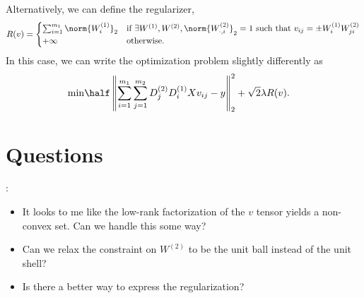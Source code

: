 \documentclass{article}
\newcommand{\wone}{W^{(1)}}
\newcommand{\wtwo}{W^{(2)}}
\newcommand{\Done}{D^{(1)}}
\newcommand{\Dtwo}{D^{(2)}}
\begin{document}
Alternatively, we can define the regularizer,
\[
    R(v) =
    \begin{cases}
        \sum_{i=1}^{m_1}
        \norm{\wone_{i}}_2
         & \mbox{if \( \exists \wone, \wtwo,
        \norm{\wtwo_{\cdot, i}}_2 = 1 \) such that \( v_{ij} = \pm \wone_{i} \wtwo_{ji} \)} \\
        +\infty
         & \mbox{otherwise.}
    \end{cases}
\]
In this case, we can write the optimization problem slightly differently as
\begin{equation}
    \begin{aligned}
        \min
         & \half \left\|
        \sum_{i = 1}^{m_1} \sum_{j = 1}^{m_2} \Dtwo_j \Done_i X v_{ij}
        - y
        \right\|_2^2
        + \sqrt{2}\lambda R(v).
    \end{aligned}
\end{equation}

\section{Questions}:

\begin{itemize}
    \item It looks to me like the low-rank factorization of the \( v \) tensor
          yields a non-convex set.
          Can we handle this some way?

    \item Can we relax the constraint on \( \wtwo \) to be the unit ball
          instead of the unit shell?

    \item Is there a better way to express the regularization?
\end{itemize}

\clearpage
\newpage

\printbibliography[]
\end{document}
